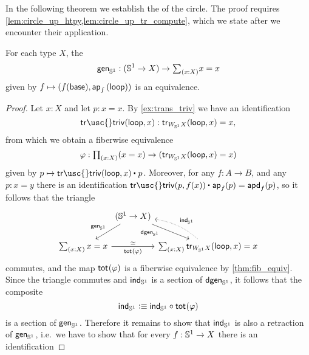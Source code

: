 In the following theorem we establish the  of the circle. The proof requires \cref{lem:circle_up_htpy,lem:circle_up_tr_compute}, which we state after we encounter their application.

\begin{thm}\label{thm:circle_up} 
For each type $X$, the 
\begin{equation*}
\mathsf{gen}_{\sphere{1}}:(\sphere{1}\to X)\to \sm{x:X}x=x
\end{equation*}
given by $f\mapsto (f(\mathsf{base}),\mathsf{ap}_{f}\left({\mathsf{loop}}\right))$ is an equivalence.
\end{thm}

\begin{proof}
Let $x:X$ and let $p:x=x$. By \cref{ex:trans_triv} we have an identification 
\begin{equation*}
\mathsf{tr\usc{}triv}(\lloop,x):\mathsf{tr}_{W_{\sphere{1}}X}(\lloop,x)=x,
\end{equation*}
from which we obtain a fiberwise equivalence
\begin{equation*}
\varphi : \prd{x:X} (x=x) \to (\mathsf{tr}_{W_{\sphere{1}}X}(\lloop,x)=x)
\end{equation*}
given by $p\mapsto \ct{\mathsf{tr\usc{}triv}(\lloop,x)}{p}$.
Moreover, for any $f:A\to B$, and any $p:x=y$ there is an identification $\ct{\mathsf{tr\usc{}triv}(p,f(x))}{\mathsf{ap}_f(p)}=\apd{f}{p}$, so it follows that the triangle
\begin{equation*}
\begin{tikzcd}[column sep=0]
& (\sphere{1}\to X) \arrow[dl,swap,"\mathsf{gen}_{\sphere{1}}"] \arrow[dr,swap,"\mathsf{dgen}_{\sphere{1}}" near start] \\
\sm{x:X}x=x \arrow[rr,"\total{\varphi}"',"\eqvsym"] & & \sm{x:X} \mathsf{tr}_{W_{\sphere{1}}X}(\lloop,x)=x \arrow[ul,densely dotted,bend right=15,swap,"\ind{\sphere{1}}"]
\end{tikzcd}
\end{equation*}
commutes, and the map $\mathsf{tot}_{}(\varphi)$ is a fiberwise equivalence by \cref{thm:fib_equiv}. Since the triangle commutes and $\mathsf{ind}_{\mathbb{S}^{1}}$ is a section of $\mathsf{dgen}_{\mathbb{S}^{1}}$, it follows that the composite
\begin{equation*}
\mathsf{ind}_{\mathbb{S}^{1}}\vcentcolon\equiv \mathsf{ind}_{\mathbb{S}^{1}}\circ \mathsf{tot}_{}(\varphi)
\end{equation*}
is a section of $\mathsf{gen}_{\mathbb{S}^{1}}$. Therefore it remains to show that $\mathsf{ind}_{\mathbb{S}^{1}}$ is also a retraction of $\mathsf{gen}_{\mathbb{S}^{1}}$, i.e.~we have to show that for every $f:\mathbb{S}^{1}\to X$ there is an identification

\end{proof}
